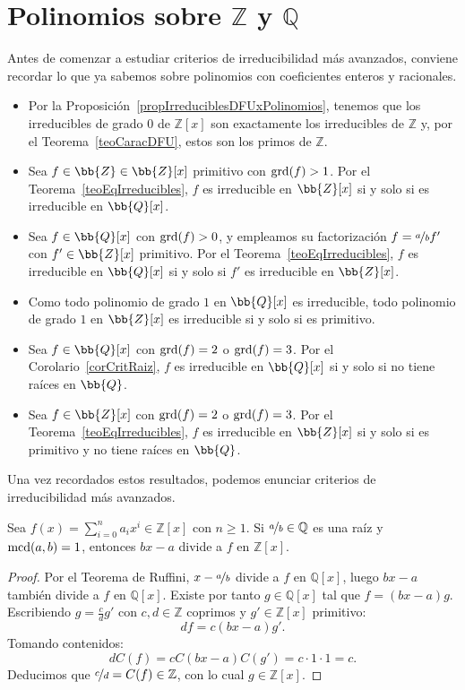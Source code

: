 \section{Polinomios sobre $\mathbb{Z}$ y $\mathbb{Q}$}

Antes de comenzar a estudiar criterios de irreducibilidad más avanzados, conviene recordar lo que ya sabemos sobre polinomios con coeficientes enteros y racionales.
\begin{itemize}
    \item Por la Proposición~\ref{propIrreduciblesDFUxPolinomios}, tenemos que los irreducibles de grado $0$ de $\mathbb{Z}[x]$ son exactamente los irreducibles de $\mathbb{Z}$ y, por el Teorema~\ref{teoCaracDFU}, estos son los primos de $\mathbb{Z}$.
    \item Sea $f\in \bb{Z}\in \bb{Z}[x]$ primitivo con $\operatorname{grd}(f)>1$. Por el Teorema~\ref{teoEqIrreducibles}, $f$ es irreducible en $\bb{Z}[x]$ si y solo si es irreducible en $\bb{Q}[x]$.
    \item Sea $f\in \bb{Q}[x]$ con $\operatorname{grd}(f)>0$, y empleamos su factorización $f = \nicefrac{a}{b} f'$ con $f'\in \bb{Z}[x]$ primitivo. Por el Teorema~\ref{teoEqIrreducibles}, $f$ es irreducible en $\bb{Q}[x]$ si y solo si $f'$ es irreducible en $\bb{Z}[x]$.
    \item Como todo polinomio de grado $1$ en $\bb{Q}[x]$ es irreducible, todo polinomio de grado $1$ en $\bb{Z}[x]$ es irreducible si y solo si es primitivo.
    \item Sea $f\in \bb{Q}[x]$ con $\operatorname{grd}(f)=2$ o $\operatorname{grd}(f)=3$. Por el Corolario~\ref{corCritRaiz}, $f$ es irreducible en $\bb{Q}[x]$ si y solo si no tiene raíces en $\bb{Q}$.
    \item Sea $f\in \bb{Z}[x]$ con $\operatorname{grd}(f)=2$ o $\operatorname{grd}(f)=3$. Por el Teorema~\ref{teoEqIrreducibles}, $f$ es irreducible en $\bb{Z}[x]$ si y solo si es primitivo y no tiene raíces en $\bb{Q}$.
\end{itemize}

Una vez recordados estos resultados, podemos enunciar criterios de irreducibilidad más avanzados.
\begin{prop}\label{propbxmenosA}
    Sea $f(x) = \sum\limits_{i=0}^n a_i x^i \in \mathbb{Z}[x]$ con $n \geq 1$. Si $\nicefrac{a}{b} \in \mathbb{Q}$ es una raíz y $\operatorname{mcd}(a,b) = 1$, entonces $bx - a$ divide a $f$ en $\mathbb{Z}[x]$.
\end{prop}

\begin{proof}
    Por el Teorema de Ruffini, $x - \nicefrac{a}{b}$ divide a $f$ en $\mathbb{Q}[x]$, luego $bx - a$ también divide a $f$ en $\mathbb{Q}[x]$. Existe por tanto $g \in \mathbb{Q}[x]$ tal que $f = (bx - a)g$. Escribiendo $g = \frac{c}{d} g'$ con $c, d \in \mathbb{Z}$ coprimos y $g' \in \mathbb{Z}[x]$ primitivo:
    \[
        df = c(bx - a)g'.
    \]
    Tomando contenidos:
    \[
        d C(f) = c C(bx - a) C(g') = c \cdot 1 \cdot 1 = c.
    \]
    Deducimos que $\nicefrac{c}{d} = C(f) \in \mathbb{Z}$, con lo cual $g \in \mathbb{Z}[x]$.
\end{proof}

